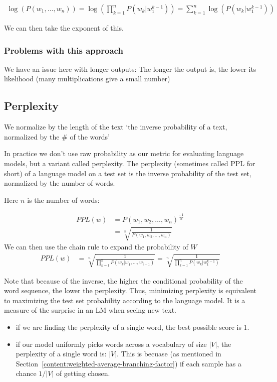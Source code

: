 \documentclass[11pt]{article}
\begin{document}
\begin{align*}
    \log(P(w_1, \ldots, w_n)) = \log(\prod^n_{k=1}P(w_k|w_1^{k-1})) = \sum^n_{k=1}\log(P(w_k|w_1^{k-1}))
\end{align*}

We can then take the exponent of this.

\subsubsection{Problems with this approach}

We have an issue here with longer outputs: The longer the output is, the lower its likelihood (many multiplications give a small number)

\subsection{Perplexity}

We normalize by the length of the text `the inverse probability of a text, normalized by the \# of the words'

\begin{definition}[Perplexity]
    In practice we don't use raw probability as our metric for evaluating language models, but a variant called perplexity. The perplexity (sometimes called PPL for short) of a language model on a test set is the inverse probability of the test set, normalized by the number of words.
\end{definition}

Here $n$ is the number of words:

\begin{align*}
    PPL(w) & =P(w_1,w_2,\ldots,w_n)^\frac{-1}{N} \\
    & = \sqrt[n]{\frac{1}{P(w_1,w_2,\ldots,w_n)}}
\end{align*}
We can then use the chain rule to expand the probability of $W$
\begin{align*}
    PPL(w) & = \sqrt[n]{\frac{1}{\prod^n_{k=1}P(w_k|w_1,\ldots,w_{i-1})}} = \sqrt[n]{\frac{1}{\prod^n_{k=1}P(w_k|w_1^{k-1})}}
\end{align*}

Note that because of the inverse, the higher the conditional probability of the word sequence, the lower the perplexity. Thus, minimizing perplexity is equivalent to maximizing the test set probability according to the language model. It is a measure of the surprise in an LM when seeing new text.

\begin{itemize}
    \item if we are finding the perplexity of a single word, the best possible score is 1.
    \item if our model uniformly picks words across a vocabulary of size $|V|$, the perplexity of a single word is: $|V|$. This is becuase (as mentioned in Section~\ref{content:weighted-average-branching-factor}) if each sample has a chance $1/|V|$ of getting chosen.
\end{itemize}
\end{document}
